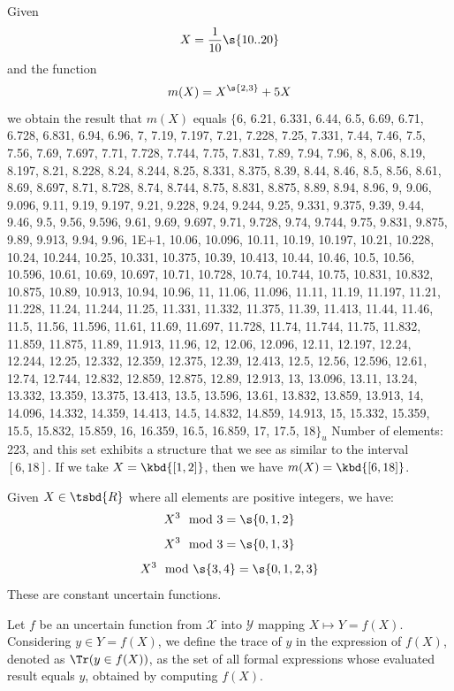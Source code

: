 \begin{example}
	Given $$X = \dfrac{1}{10}\s{10..20} $$ and the function $$m(X) = X^{\s{2,3}}+5X $$ we obtain the result that $m(X)$ equals
	$\{$6, 6.21, 6.331, 6.44, 6.5, 6.69, 6.71, 6.728, 6.831, 6.94, 6.96, 7, 7.19, 7.197, 7.21, 7.228, 7.25, 7.331, 7.44, 7.46, 7.5, 7.56, 7.69, 7.697, 7.71, 7.728, 7.744, 7.75, 7.831, 7.89, 7.94, 7.96, 8, 8.06, 8.19, 8.197, 8.21, 8.228, 8.24, 8.244, 8.25, 8.331, 8.375, 8.39, 8.44, 8.46, 8.5, 8.56, 8.61, 8.69, 8.697, 8.71, 8.728, 8.74, 8.744, 8.75, 8.831, 8.875, 8.89, 8.94, 8.96, 9, 9.06, 9.096, 9.11, 9.19, 9.197, 9.21, 9.228, 9.24, 9.244, 9.25, 9.331, 9.375, 9.39, 9.44, 9.46, 9.5, 9.56, 9.596, 9.61, 9.69, 9.697, 9.71, 9.728, 9.74, 9.744, 9.75, 9.831, 9.875, 9.89, 9.913, 9.94, 9.96, 1E+1, 10.06, 10.096, 10.11, 10.19, 10.197, 10.21, 10.228, 10.24, 10.244, 10.25, 10.331, 10.375, 10.39, 10.413, 10.44, 10.46, 10.5, 10.56, 10.596, 10.61, 10.69, 10.697, 10.71, 10.728, 10.74, 10.744, 10.75, 10.831, 10.832, 10.875, 10.89, 10.913, 10.94, 10.96, 11, 11.06, 11.096, 11.11, 11.19, 11.197, 11.21, 11.228, 11.24, 11.244, 11.25, 11.331, 11.332, 11.375, 11.39, 11.413, 11.44, 11.46, 11.5, 11.56, 11.596, 11.61, 11.69, 11.697, 11.728, 11.74, 11.744, 11.75, 11.832, 11.859, 11.875, 11.89, 11.913, 11.96, 12, 12.06, 12.096, 12.11, 12.197, 12.24, 12.244, 12.25, 12.332, 12.359, 12.375, 12.39, 12.413, 12.5, 12.56, 12.596, 12.61, 12.74, 12.744, 12.832, 12.859, 12.875, 12.89, 12.913, 13, 13.096, 13.11, 13.24, 13.332, 13.359, 13.375, 13.413, 13.5, 13.596, 13.61, 13.832, 13.859, 13.913, 14, 14.096, 14.332, 14.359, 14.413, 14.5, 14.832, 14.859, 14.913, 15, 15.332, 15.359, 15.5, 15.832, 15.859, 16, 16.359, 16.5, 16.859, 17, 17.5, 18$\}_u$
	\newline \noindent Number of elements: 223, and this set exhibits a structure that we see as similar to the interval $[6,18]$.
	\newline \noindent If we take $X = \kbd{[1,2]}$, then we have $m(X) = \kbd{[6,18]}$.
\end{example}
\begin{example}
	Given $X \in \tsbd{R}$ where all elements are positive integers, we have:
	$$X^3 \mod 3 = \s{0,1,2}$$
	$$X^3 \mod 3 = \s{0,1,3}$$
	$$X^3 \mod \s{3,4} = \s{0,1,2,3}$$
	These are constant uncertain functions.
\end{example}
\begin{definition}[Trace]
	Let $f$ be an uncertain function from $\mathcal{X}$ into $\mathcal{Y}$ mapping $X \mapsto Y = f(X)$.
	\newline \noindent
	Considering $y \in Y = f(X)$, we define the trace of $y$ in the expression of $f(X)$, denoted as $\Tr(y \in f(X))$, as the set of all formal expressions whose evaluated result equals $y$, obtained by computing $f(X)$.
\end{definition}
